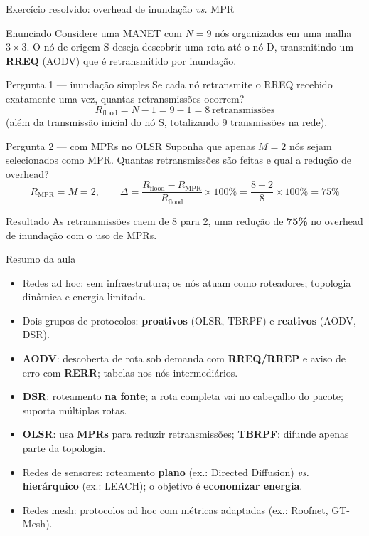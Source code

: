 \documentclass[aspectratio=169,11pt]{beamer}
\begin{document}
\begin{frame}{Exercício resolvido: overhead de inundação \emph{vs.} MPR}
  \begin{block}{Enunciado}
    Considere uma MANET com $N = 9$ nós organizados em uma malha $3\times 3$. O nó de origem S deseja descobrir uma rota até o nó D, transmitindo um \textbf{RREQ} (AODV) que é retransmitido por inundação.
  \end{block}
  \begin{block}{Pergunta 1 --- inundação simples}
    Se cada nó retransmite o RREQ recebido exatamente uma vez, quantas retransmissões ocorrem?
    \[
      R_{\text{flood}} = N - 1 = 9 - 1 = 8\ \text{retransmissões}
    \]
    (além da transmissão inicial do nó S, totalizando 9 transmissões na rede).
  \end{block}
  \begin{block}{Pergunta 2 --- com MPRs no OLSR}
    Suponha que apenas $M = 2$ nós sejam selecionados como MPR. Quantas retransmissões são feitas e qual a redução de overhead?
    \[
      R_{\text{MPR}} = M = 2, \qquad
      \Delta = \frac{R_{\text{flood}} - R_{\text{MPR}}}{R_{\text{flood}}} \times 100\%
            = \frac{8 - 2}{8} \times 100\% = 75\%
    \]
  \end{block}
  \begin{alertblock}{Resultado}
    As retransmissões caem de 8 para 2, uma redução de \textbf{75\%} no overhead de inundação com o uso de MPRs.
  \end{alertblock}
\end{frame}

\begin{frame}{Resumo da aula}
  \begin{itemize}
    \item Redes ad hoc: sem infraestrutura; os nós atuam como roteadores; topologia dinâmica e energia limitada.
    \item Dois grupos de protocolos: \textbf{proativos} (OLSR, TBRPF) e \textbf{reativos} (AODV, DSR).
    \item \textbf{AODV}: descoberta de rota sob demanda com \textbf{RREQ/RREP} e aviso de erro com \textbf{RERR}; tabelas nos nós intermediários.
    \item \textbf{DSR}: roteamento \textbf{na fonte}; a rota completa vai no cabeçalho do pacote; suporta múltiplas rotas.
    \item \textbf{OLSR}: usa \textbf{MPRs} para reduzir retransmissões; \textbf{TBRPF}: difunde apenas parte da topologia.
    \item Redes de sensores: roteamento \textbf{plano} (ex.: Directed Diffusion) \emph{vs.} \textbf{hierárquico} (ex.: LEACH); o objetivo é \textbf{economizar energia}.
    \item Redes mesh: protocolos ad hoc com métricas adaptadas (ex.: Roofnet, GT-Mesh).
  \end{itemize}
\end{frame}
\end{document}
